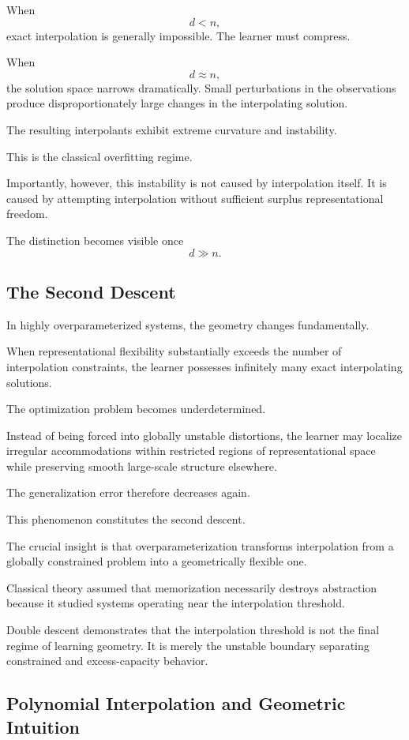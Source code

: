 \documentclass[12pt,a4paper]{article}
\begin{document}
When
\[
d < n,
\]
exact interpolation is generally impossible. The learner must compress.

When
\[
d \approx n,
\]
the solution space narrows dramatically. Small perturbations in the observations produce disproportionately large changes in the interpolating solution.

The resulting interpolants exhibit extreme curvature and instability.

This is the classical overfitting regime.

Importantly, however, this instability is not caused by interpolation itself. It is caused by attempting interpolation without sufficient surplus representational freedom.

The distinction becomes visible once
\[
d \gg n.
\]

\subsection{The Second Descent}

In highly overparameterized systems, the geometry changes fundamentally.

When representational flexibility substantially exceeds the number of interpolation constraints, the learner possesses infinitely many exact interpolating solutions.

The optimization problem becomes underdetermined.

Instead of being forced into globally unstable distortions, the learner may localize irregular accommodations within restricted regions of representational space while preserving smooth large-scale structure elsewhere.

The generalization error therefore decreases again.

This phenomenon constitutes the second descent.

The crucial insight is that overparameterization transforms interpolation from a globally constrained problem into a geometrically flexible one.

Classical theory assumed that memorization necessarily destroys abstraction because it studied systems operating near the interpolation threshold.

Double descent demonstrates that the interpolation threshold is not the final regime of learning geometry. It is merely the unstable boundary separating constrained and excess-capacity behavior.

\subsection{Polynomial Interpolation and Geometric Intuition}
\end{document}
